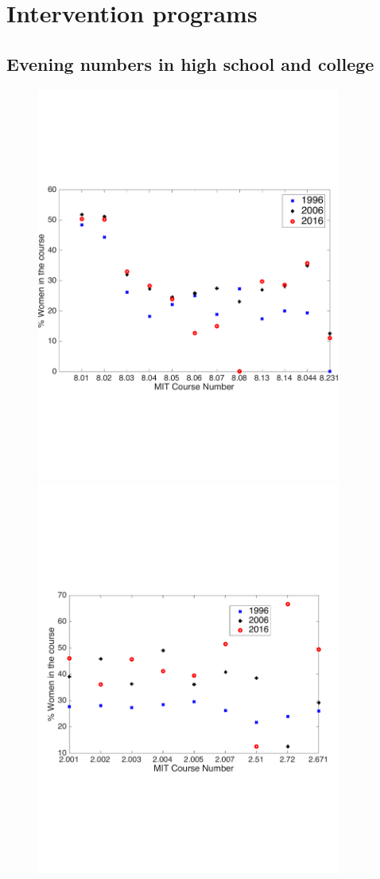 \documentclass[utf8]{frontiersSCNS} %
\begin{document}
\section{Intervention programs}
\label{Sec6}
\subsection{Evening numbers in high school and college}
\label{6.1}
\begin{figure}%
  \centering
  \includegraphics[width=10cm]{WomenMITPhysics.pdf}
  \includegraphics[width=10cm]{MECoursesMIT.pdf}

\end{figure}
\end{document}
